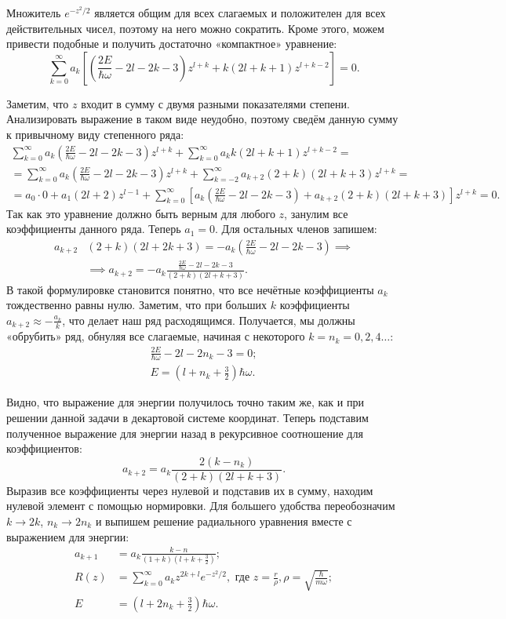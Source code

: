 Множитель $e^{-z^2/2}$ является общим для всех слагаемых и положителен для всех
действительных чисел, поэтому на него можно сократить. Кроме этого, можем
привести подобные и получить достаточно «компактное» уравнение:
\[
  \sum_{k=0}^\infty a_k \left[\left(\frac{2E}{\hbar\omega} - 2l - 2k - 3\right)z^{l+k} + k(2l+k+1) z^{l+k-2}\right] = 0.
\]

Заметим, что $z$ входит в сумму с двумя разными показателями степени.
Анализировать выражение в таком виде неудобно, поэтому сведём данную сумму к
привычному виду степенного ряда:
\begin{gather*}
  \sum_{k=0}^\infty a_k\left(\frac{2E}{\hbar\omega} - 2l - 2k -3\right)z^{l+k} + \sum_{k=0}^\infty a_k k(2l+k+1)z^{l+k-2} = \\
  = \sum_{k=0}^\infty a_k\left(\frac{2E}{\hbar\omega} - 2l - 2k -3\right)z^{l+k} + \sum_{k=-2}^\infty a_{k+2}(2+k)(2l+k+3)z^{l+k} = \\
  = a_0\cdot0 + a_1(2l+2)z^{l-1} + \sum_{k=0}^\infty \left[a_k\left(\frac{2E}{\hbar\omega} - 2l - 2k - 3\right) + a_{k+2}(2+k)(2l+k+3)\right]z^{l+k} = 0.
\end{gather*}
Так как это уравнение должно быть верным для любого $z$, занулим все
коэффициенты данного ряда. Теперь $a_1 = 0$. Для остальных членов запишем:
\begin{align*}
  a_{k+2}&(2+k)(2l+2k+3) = -a_k\left(\frac{2E}{\hbar\omega}-2l-2k-3\right) \implies \\
  &\implies a_{k+2} = -a_k\frac{\frac{2E}{\hbar\omega}-2l-2k-3}{(2+k)(2l+k+3)}.
\end{align*}
В такой формулировке становится понятно, что все нечётные коэффициенты $a_k$
тождественно равны нулю. Заметим, что при больших $k$ коэффициенты $a_{k+2}
  \approx -\frac{a_k}{k}$, что делает наш ряд расходящимся. Получается, мы должны
«обрубить» ряд, обнуляя все слагаемые, начиная с некоторого $k = n_k = 0, 2, 4
  \dots$:
\begin{gather*}
  \frac{2E}{\hbar\omega}-2l-2n_k-3 = 0;\\
  E = \left(l+n_k+\frac{3}{2}\right)\hbar\omega.
\end{gather*}

Видно, что выражение для энергии получилось точно таким же, как и при решении
данной задачи в декартовой системе координат. Теперь подставим полученное
выражение для энергии назад в рекурсивное соотношение для коэффициентов:
\[
  a_{k+2} = a_k\frac{2(k-n_k)}{(2+k)(2l+k+3)}.
\]
Выразив все коэффициенты через нулевой и подставив их в сумму, находим нулевой
элемент с помощью нормировки. Для большего удобства переобозначим
$k\rightarrow2k$, $n_k\rightarrow2n_k$ и выпишем решение радиального уравнения
вместе с выражением для энергии:
\begin{align*}
  a_{k+1} &= a_k\frac{k-n}{\left(1+k\right)\left(l+k+\frac{3}{2}\right)}; \\
  R(z) &= \sum_{k=0}^\infty a_k z^{2k+l} e^{-z^2/2}, \text{ где } z = \frac{r}{\rho}, \rho = \sqrt{\frac{\hbar}{m\omega}}; \\
  E &= \left(l+2n_k+\frac{3}{2}\right)\hbar\omega.
\end{align*}

